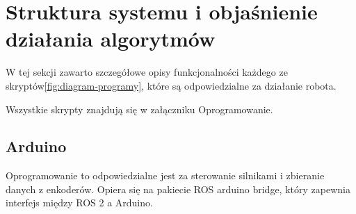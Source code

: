 \documentclass[a4paper,twoside,12pt]{book}
\begin{document}
\newpage
\section{Struktura systemu i objaśnienie działania algorytmów}

W tej sekcji zawarto szczegółowe opisy funkcjonalności każdego ze skryptów\ref{fig:diagram-programy}, które są odpowiedzialne za działanie robota.

Wszystkie skrypty znajdują się w załączniku Oprogramowanie.
\subsection{Arduino}
Oprogramowanie to odpowiedzialne jest za sterowanie silnikami i zbieranie danych z enkoderów. Opiera się na pakiecie ROS arduino bridge\cite{bib:rosarduinobridge}, który zapewnia interfejs między ROS 2 a Arduino. 
\end{document}

